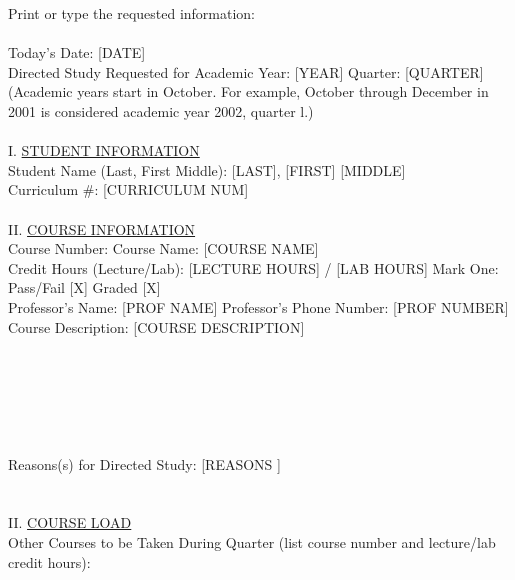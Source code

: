 \documentclass{article}
\begin{document}
\noindent Print or type the requested information:\\
\\
Today's Date: [DATE] \\
Directed Study Requested for Academic Year: [YEAR] Quarter: [QUARTER] \\
(Academic years start in October. For example, October through December in 2001 is considered academic year 2002, quarter l.)\\
\\
I. \underline{STUDENT INFORMATION}\\
Student Name (Last, First Middle): [LAST], [FIRST] [MIDDLE] \\
Curriculum \#: [CURRICULUM NUM] \\
\\
%
II. \underline{COURSE INFORMATION}\\
Course Number: \shortspace \hfill Course Name: [COURSE NAME] \\ 
Credit Hours (Lecture/Lab): [LECTURE HOURS] / [LAB HOURS] \hfill Mark One: Pass/Fail [X] Graded [X] \\ 
Professor's Name: [PROF NAME] \hfill Professor's Phone Number: [PROF NUMBER] \\
Course Description: [COURSE DESCRIPTION] \\
\HRule \\
\HRule \\
\HRule \\
\HRule \\
\HRule \\
\HRule \\
Reasons(s) for Directed Study: [REASONS ] \\
\HRule \\
\\
II. \underline{COURSE LOAD} \\
Other Courses to be Taken During Quarter (list course number and lecture/lab credit hours):\\
\end{document}
